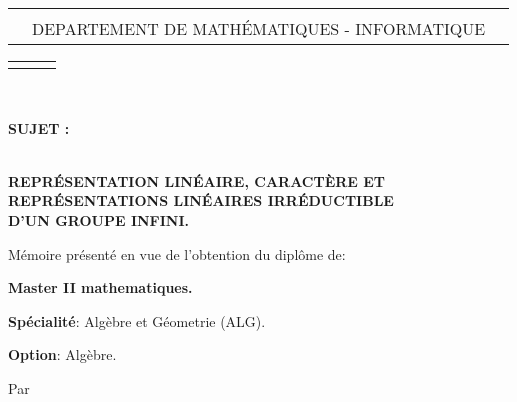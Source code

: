 \documentclass[a4paper, 14pt]{report}
\begin{document}
	\begin{center}
		\begin{tabularx}{\textwidth}{>{\centering}XcX<{\centering}}
			
			& & \\
			& DEPARTEMENT DE MATHÉMATIQUES - INFORMATIQUE & \\
			
		\end{tabularx}
	\end{center}
	\begin{tabularx}{\textwidth}{>{\centering}XcX<{\centering}}
		& & \\
		
	\end{tabularx}\\
	\begin{center}
		
		\textbf{ SUJET :}
		\begin{tcolorbox}[
			colframe=blue!70,      %
			colback=blue!10,       %
			coltitle=black,        %
			boxrule=1mm,         %
			arc=5mm,               %
			width=\textwidth ,      %
			center                 %
			]
			\centering
			
			{\textbf{\large \\
					REPRÉSENTATION  LINÉAIRE, CARACTÈRE ET \\
					REPRÉSENTATIONS LINÉAIRES IRRÉDUCTIBLE \\
					D'UN GROUPE INFINI.\\ }}
		\end{tcolorbox}
		
		\vspace{1cm}
		
		
		{\fontsize{14}{12}\selectfont
			
			Mémoire présenté en vue de l’obtention du diplôme de:
			\begin{center}
				\textbf{Master II mathematiques.}
			\end{center}
			
			\textbf{Spécialité}: Algèbre et Géometrie (ALG).
			
			\begin{center}
				\textbf{Option}: Algèbre.
			\end{center}
			
			\begin{center}
				Par
			\end{center}
			
}
\end{center}
\end{document}
